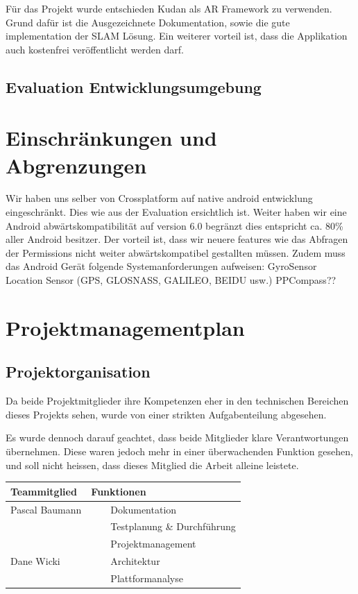 \documentclass[a4paper]{scrreprt}
\newcommand{\tabitem}{~~\llap{\textbullet}~~}
\begin{document}
Für das Projekt wurde entschieden Kudan als AR Framework zu verwenden. Grund dafür ist die Ausgezeichnete Dokumentation, sowie die gute implementation der SLAM Lösung. Ein weiterer vorteil ist, dass die Applikation auch kostenfrei veröffentlicht werden darf.

\subsection{Evaluation Entwicklungsumgebung}

\section{Einschränkungen und Abgrenzungen}
Wir haben uns selber von Crossplatform auf native android entwicklung eingeschränkt. Dies wie aus der Evaluation ersichtlich ist.
Weiter haben wir eine Android abwärtskompatibilität auf version 6.0 begränzt dies entspricht ca. 80\% aller Android besitzer. Der vorteil ist, dass wir neuere features wie das Abfragen der Permissions nicht weiter abwärtskompatibel gestallten müssen.
Zudem muss das Android Gerät folgende Systemanforderungen aufweisen:
	GyroSensor
	Location Sensor (GPS, GLOSNASS, GALILEO, BEIDU usw.)
	PPCompass??


\section{Projektmanagementplan}


\subsection{Projektorganisation}
Da beide Projektmitglieder ihre Kompetenzen eher in den technischen Bereichen dieses Projekts sehen, wurde von einer strikten Aufgabenteilung abgesehen.

Es wurde dennoch darauf geachtet, dass beide Mitglieder klare Verantwortungen übernehmen. Diese waren jedoch mehr in einer überwachenden Funktion gesehen, und soll nicht heissen, dass dieses Mitglied die Arbeit alleine leistete.

\vspace{1em}

\begin{tabularx}{\textwidth}{|X|X|}
	\hline
	\textbf{Teammitglied} & \textbf{Funktionen} \\
	\hline
	Pascal Baumann & \tabitem Dokumentation \\
	& \tabitem Testplanung \& Durchführung \\
	& \tabitem Projektmanagement \\
	\hline
	Dane Wicki & \tabitem Architektur \\
	& \tabitem Plattformanalyse \\
	\hline
\end{tabularx}
\end{document}
